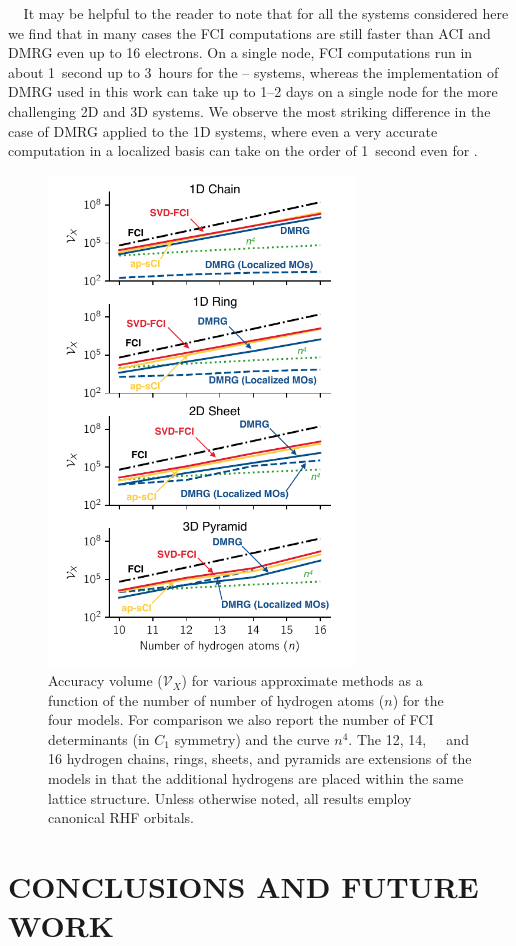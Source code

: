 \documentclass[aip,jcp,amsmath,amssymb, preprint]{revtex4-1}
\newcommand*{\ncomp}{\mathcal{V}_X}
\newcommand{\add}[1]{\colorbox{goodgreen}{\textcolor{white}{\footnotesize  \fontfamily{phv}\selectfont +}}
    \textcolor{goodgreen}{{#1}}\xspace}
\begin{document}
\add{It may be helpful to the reader to note that for all the systems considered here we find that in many cases the FCI computations are still faster than ACI and DMRG even up to 16 electrons.
On a single node, FCI computations run in about 1~second up to 3~hours for the \ce{H10}--\ce{H16} systems, whereas the implementation of DMRG used in this work can take up to 1--2 days on a single node for the more challenging 2D and 3D systems. We observe the most striking difference in the case of DMRG applied to the 1D systems, where even a very accurate computation in a localized basis can take on the order of 1~second even for \ce{H16}.}
\begin{figure}[h!]
\centering
\includegraphics[width=3.2in]{figure_7.pdf}
\caption{Accuracy volume ($\ncomp$) for various approximate methods as a function of the number of number of hydrogen atoms ($n$) for the four  models.
For comparison we also report the number of FCI determinants (in $C_1$ symmetry) and the curve $n^4$.
The 12, 14, \add{and 16} hydrogen chains, rings, sheets, and pyramids are extensions of the  models in that the additional hydrogens are placed within the same lattice structure.
Unless otherwise noted, all results employ canonical RHF orbitals.}
\label{fig:h10compression_n}
\end{figure}
    
\section{\label{sec:conclusions}CONCLUSIONS AND FUTURE WORK}
\end{document}
